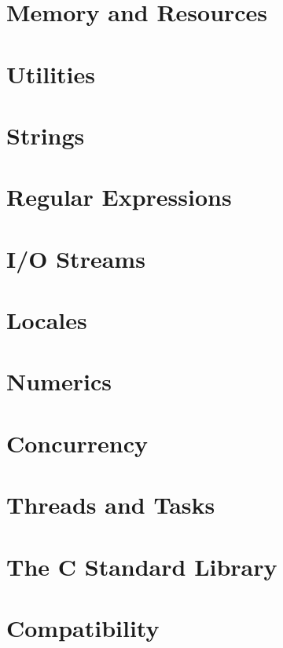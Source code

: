 \documentclass[12pt,letterpaper]{book}
\theoremstyle{definition}
\theoremstyle{remark}
\begin{document}

\chapter{Memory and Resources}


\chapter{Utilities}


\chapter{Strings}


\chapter{Regular Expressions}


\chapter{I/O Streams}


\chapter{Locales}


\chapter{Numerics}


\chapter{Concurrency}


\chapter{Threads and Tasks}


\chapter{The C Standard Library}


\chapter{Compatibility}

\end{document}
